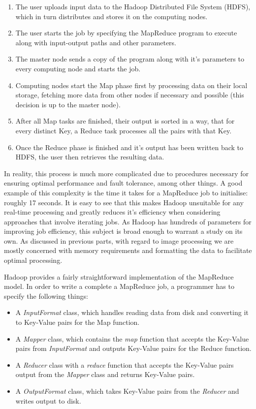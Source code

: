 \documentclass [12pt,a4paper]{report}
\begin{document}
\begin{enumerate} 
\item The user uploads input data to the Hadoop Distributed File System (HDFS), which in turn distributes and stores it on the computing nodes.
\item The user starts the job by specifying the MapReduce program to execute along with input-output paths and other parameters.
\item The master node sends a copy of the program along with it's parameters to every computing node and starts the job.
\item Computing nodes start the Map phase first by processing data on their local storage, fetching more data from other nodes if necessary and possible (this decision is up to the master node).
\item After all Map tasks are finished, their output is sorted in a way, that for every distinct Key, a Reduce task processes all the pairs with that Key.
\item Once the Reduce phase is finished and it's output has been written back to HDFS, the user then retrieves the resulting data.
\end{enumerate}

In reality, this process is much more complicated due to procedures necessary for ensuring optimal performance and fault tolerance, among other things. A good example of this complexity is the time it takes for a MapReduce job to initialise: roughly 17 seconds. It is easy to see that this makes Hadoop unsuitable for any real-time processing and greatly reduces it's efficiency when considering approaches that involve iterating jobs. As Hadoop has hundreds of parameters for improving job efficiency, this subject is broad enough to warrant a study on its own. As discussed in previous parts, with regard to image processing we are mostly concerned with memory requirements and formatting the data to facilitate optimal processing.

Hadoop provides a fairly straightforward implementation of the MapReduce model. In order to write a complete a MapReduce job, a programmer has to specify the following things:

\begin{itemize}
\item A \textit{InputFormat} class, which handles reading data from disk and converting it to Key-Value pairs for the Map function. 
\item A \textit{Mapper} class, which contains the \textit{map} function that accepts the Key-Value pairs from \textit{InputFormat} and outputs Key-Value pairs for the Reduce function.
\item A \textit{Reducer} class with a \textit{reduce} function that accepts the Key-Value pairs output from the \textit{Mapper} class and returns Key-Value pairs.
\item A \textit{OutputFormat} class, which takes Key-Value pairs from the \textit{Reducer} and writes output to disk.
\end{itemize} 
\end{document}
